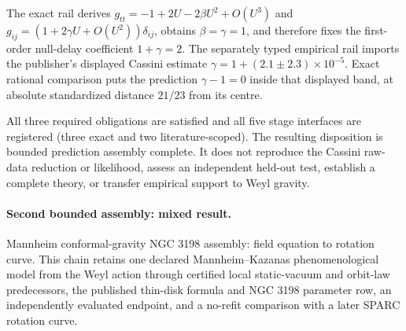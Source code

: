 The exact rail derives \(g_{tt}=-1+2U-2\beta U^2+O(U^3)\) and \(g_{ij}=(1+2\gamma U+O(U^2))\delta_{ij}\), obtains \(\beta=\gamma=1\), and therefore fixes the first-order null-delay coefficient \(1+\gamma=2\).  The separately typed empirical rail imports the publisher's displayed Cassini estimate \(\gamma=1+(2.1\mathbin{\pm}2.3)\times10^{-5}\).  Exact rational comparison puts the prediction \(\gamma-1=0\) inside that displayed band, at absolute standardized distance \(21/23\) from its centre.

All three required obligations are satisfied and all five stage interfaces are registered (three exact and two literature-scoped).  The resulting disposition is bounded prediction assembly complete.  It does not reproduce the Cassini raw-data reduction or likelihood, assess an independent held-out test, establish a complete theory, or transfer empirical support to Weyl gravity.

\paragraph{Second bounded assembly: mixed result.}
Mannheim conformal-gravity NGC 3198 assembly: field equation to rotation curve.  This chain retains one declared Mannheim--Kazanas phenomenological model from the Weyl action through certified local static-vacuum and orbit-law predecessors, the published thin-disk formula and NGC 3198 parameter row, an independently evaluated endpoint, and a no-refit comparison with a later SPARC rotation curve.


